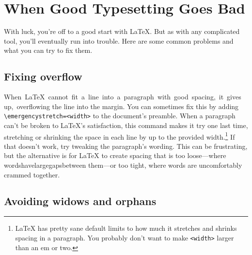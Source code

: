 \chapter{When Good Typesetting Goes Bad}

With luck, you're off to a good start with \LaTeX.
But as with any complicated tool, you'll eventually run into trouble.
Here are some common problems and what you can try to fix them.

\section{Fixing overflow}

\mbox{When \LaTeX{} cannot fit a line into a paragraph with good spacing,
it gives up, overflowing} the line into the margin.
You can sometimes fix this by adding
\texttt{\textbackslash emergencystretch=\allowbreak<width>}
to the document's preamble.
When a paragraph can't be broken to \LaTeX's satisfaction,
this command makes it try one last time,
stretching or shrinking the space in each line by up to the provided
width.\punckern\footnote{\LaTeX{} has pretty sane default limits to how much
it stretches and shrinks spacing in a paragraph.
You probably don't want to make \texttt{<width>} larger than an em or two.}
If that doesn't work, try tweaking the paragraph's wording.
This can be frustrating, but the alternative is for \LaTeX{} to create spacing
that is too loose---where\enspace
words\enspace have\enspace large\quad gaps\quad between\enspace
them---or too tight, where\! words\! are\! uncomfortably\! crammed\! together.

\section{Avoiding widows and orphans}

